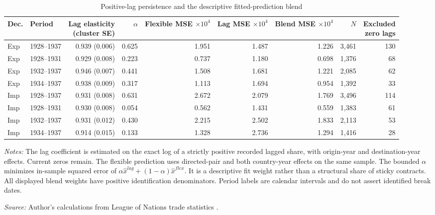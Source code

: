 \begin{table}[!htbp]\centering
\caption{Positive-lag persistence and the descriptive fitted-prediction blend}\label{tab:app_lag}
\begin{threeparttable}\small\setlength{\tabcolsep}{4pt}
\begin{tabular}{@{}llrrrrrrr@{}}
\toprule
Dec. & Period & \shortstack{Lag elasticity\\(cluster SE)} & $\alpha$ & \shortstack{Flexible MSE\\$\times10^4$} & \shortstack{Lag MSE\\$\times10^4$} & \shortstack{Blend MSE\\$\times10^4$} & $N$ & \shortstack{Excluded\\zero lags} \\
\midrule
Exp & 1928--1937 & 0.939 (0.006) & 0.625 & 1.951 & 1.487 & 1.226 & 3,461 & 130 \\
Exp & 1928--1931 & 0.929 (0.008) & 0.223 & 0.737 & 1.180 & 0.698 & 1,376 & 68 \\
Exp & 1932--1937 & 0.946 (0.007) & 0.441 & 1.508 & 1.681 & 1.221 & 2,085 & 62 \\
Exp & 1934--1937 & 0.938 (0.009) & 0.317 & 1.113 & 1.694 & 0.954 & 1,392 & 33 \\
Imp & 1928--1937 & 0.931 (0.008) & 0.631 & 2.672 & 2.079 & 1.769 & 3,496 & 114 \\
Imp & 1928--1931 & 0.930 (0.008) & 0.054 & 0.562 & 1.431 & 0.559 & 1,383 & 61 \\
Imp & 1932--1937 & 0.931 (0.012) & 0.430 & 2.215 & 2.502 & 1.833 & 2,113 & 53 \\
Imp & 1934--1937 & 0.914 (0.015) & 0.133 & 1.328 & 2.736 & 1.294 & 1,416 & 28 \\
\bottomrule
\end{tabular}
\begin{tablenotes}[flushleft]\footnotesize\item \textit{Notes:} The lag coefficient is estimated on the exact log of a strictly positive recorded lagged share, with origin-year and destination-year effects. Current zeros remain. The flexible prediction uses directed-pair and both country-year effects on the same sample. The bounded $\alpha$ minimizes in-sample squared error of $\alpha\widehat x^{lag}+(1-\alpha)\widehat x^{flex}$. It is a descriptive fit weight rather than a structural share of sticky contracts. All displayed blend weights have positive identification denominators. Period labels are calendar intervals and do not assert identified break dates.
\item \textit{Source:} Author's calculations from League of Nations trade statistics \parencite{league1930,league1936,league1938}.
\end{tablenotes}\end{threeparttable}\end{table}
